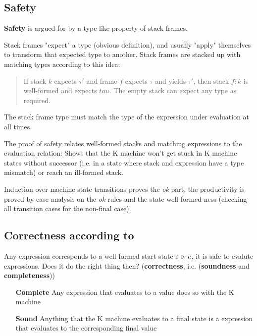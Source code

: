 \documentclass[12pt,a4paper]{article}
\begin{document}
\subsection*{Safety}
\textbf{Safety} is argued for by a type-like property of stack frames.

Stack frames "expect" a type (obvious definition), and usually "apply" themselves
to transform that expected type to another.
Stack frames are stacked up with matching types according to this idea:

\begin{quote}
If stack $k$ expects $\tau'$ and frame $f$ expects $\tau$ and yields $\tau'$,
then stack $f:k$ is well-formed and expects $tau$. The empty stack can expect any type as required.

\end{quote}

The stack frame type must match the type of the expression under evaluation
at all times.

The proof of safety relates well-formed stacks and matching expressions to 
the evaluation relation: 
Shows that the K machine won't get stuck in K machine states without successor
(i.e. in a state
where stack and expression have a type mismatch) or  reach an ill-formed stack.

Induction over machine state transitions proves the \textit{ok} part,
the productivity is proved by case analysis on the \textit{ok} rules and
the state well-formed-ness (checking all transition cases for the non-final case).

\subsection*{Correctness according to \PCF}

Any \PCF expression corresponds to a well-formed start state $\varepsilon \, \triangleright \, e$,
it is safe to evalute \PCF expressions. Does it do the right thing then?
(\textbf{correctness}, i.e. (\textbf{soundness} and \textbf{completeness}))

\begin{itemize}
\item[\bf Complete] Any \PCF expression that evaluates to a value does so with the K machine
\item[\bf Sound] Anything that the K machine evaluates to a final state is a \PCF expression that evaluates to the corresponding final value
\end{itemize}
\end{document}
